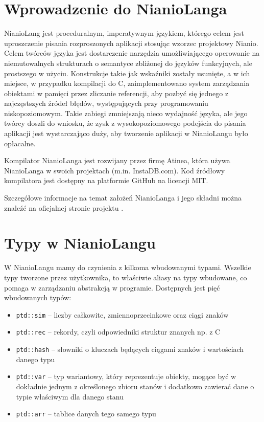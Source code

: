 \documentclass[licencjacka]{pracamgr}
\begin{document}
\section{Wprowadzenie do NianioLanga}
NianioLang jest proceduralnym, imperatywnym językiem, którego celem jest
uproszczenie pisania rozproszonych aplikacji stosując wzorzec projektowy
Nianio\cite{wzorzec_nianio}.
Celem twórców języka jest dostarczenie narzędzia umożliwiającego operowanie na niemutowalnych strukturach
o semantyce zbliżonej do języków funkcyjnych, ale prostszego w użyciu.
Konstrukcje takie jak wskaźniki zostały usunięte, a w ich miejsce, w przypadku kompilacji do C,
zaimplementowano system zarządzania obiektami
w pamięci przez zliczanie referencji, aby pozbyć się jednego z najczęstszych źródeł błędów, występujących przy programowaniu niskopoziomowym.
Takie zabiegi zmniejszają nieco wydajność języka, ale jego twórcy doszli do wniosku, że zysk z wysokopoziomowego podejścia
do pisania aplikacji jest wystarczająco duży, aby tworzenie aplikacji w NianioLangu było opłacalne.

Kompilator NianioLanga jest rozwijany przez firmę Atinea, która używa NianioLanga w swoich projektach (m.in. InstaDB.com).
Kod źródłowy kompilatora jest dostępny na platformie GitHub\cite{github_repo_nianiolang_original} na licencji MIT.

Szczegółowe informacje na temat założeń NianioLanga i jego składni można znaleźć na oficjalnej
stronie projektu \cite{nianiolang_org}.

\section{Typy w NianioLangu}
W NianioLangu mamy do czynienia z kilkoma wbudowanymi typami. Wszelkie typy tworzone przez użytkownika, to właściwie aliasy na typy wbudowane,
co pomaga w zarządzaniu abstrakcją w programie. Dostępnych jest pięć wbudowanych typów: 
\begin{itemize}
  \item \texttt{ptd::sim} -- liczby całkowite, zmiennoprzecinkowe oraz ciągi znaków
  \item \texttt{ptd::rec} -- rekordy, czyli odpowiedniki struktur znanych np. z C
  \item \texttt{ptd::hash} -- słowniki o kluczach będących ciągami znaków i wartościach danego typu
  \item \texttt{ptd::var} -- typ wariantowy, który reprezentuje obiekty, mogące być w dokładnie jednym z określonego zbioru stanów i dodatkowo
  zawierać dane o typie właściwym dla danego stanu
  \item \texttt{ptd::arr} -- tablice danych tego samego typu
\end{itemize}
\end{document}
